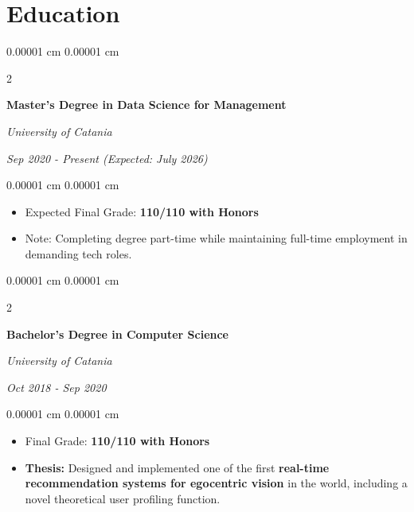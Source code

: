 \documentclass[10pt, letterpaper]{article}
\newenvironment{highlights}{
    \begin{itemize}[
        topsep=0.05 cm,
        parsep=0.05 cm,
        partopsep=0pt,
        itemsep=0pt,
        leftmargin=0.4 cm + 10pt
    ]
}{
    \end{itemize}
} %
\newenvironment{onecolentry}{
    \begin{adjustwidth}{
         0.00001 cm
    }{
        0.00001 cm
    }
}{
    \end{adjustwidth}
} %
\newenvironment{twocolentry}[2][]{
    \onecolentry
    \def\secondColumn{#2}
    \setcolumnwidth{\fill, 4.5 cm}
    \begin{paracol}{2}
}{
    \switchcolumn \raggedleft \secondColumn
    \end{paracol}
    \endonecolentry
} %
\begin{document}
    \section{Education}



        
        \begin{twocolentry}{
            
            
        \textit{Sep 2020 - Present (Expected: July 2026)}}
            \textbf{Master’s Degree in Data Science for Management}

            \textit{University of Catania}
        \end{twocolentry}

        \vspace{0.10 cm}
        \begin{onecolentry}
            \begin{highlights}
                \item Expected Final Grade: \textbf{110/110 with Honors}
                \item Note: Completing degree part-time while maintaining full-time employment in demanding tech roles.
            \end{highlights}
        \end{onecolentry}
                            \vspace{0.15 cm}

        \begin{twocolentry}{
            

        \textit{Oct 2018 - Sep 2020}}
            \textbf{Bachelor’s Degree in Computer Science}

            \textit{University of Catania}
        \end{twocolentry}

        \vspace{0.10 cm}
        \begin{onecolentry}
            \begin{highlights}
                \item Final Grade: \textbf{110/110 with Honors}
                \item \textbf{Thesis:} Designed and implemented one of the first \textbf{real-time recommendation systems for egocentric vision} in the world, including a novel theoretical user profiling function.
            \end{highlights}
        \end{onecolentry}
\end{document}
